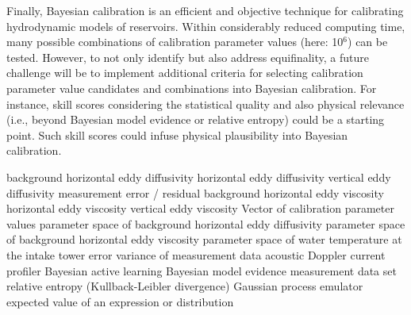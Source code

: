 \documentclass[draft,linenumbers,onecolumn]{agujournal2019} %
\begin{document}
Finally, Bayesian calibration is an efficient and objective technique for calibrating hydrodynamic models of reservoirs. Within considerably reduced computing time, many possible combinations of calibration parameter values (here: 10$^6$) can be tested. However, to not only identify but also address equifinality, a future challenge will be to implement additional criteria for selecting calibration parameter value candidates and combinations into Bayesian calibration. For instance, skill scores considering the statistical quality and also physical relevance (i.e., beyond Bayesian model evidence or relative entropy) could be a starting point. Such skill scores could infuse physical plausibility into Bayesian calibration.


\begin{notation}
	 background horizontal eddy diffusivity
	 horizontal eddy diffusivity
	 vertical eddy diffusivity
	\notation{$\varepsilon$} measurement error / residual
	 background horizontal eddy viscosity
	 horizontal eddy viscosity
	 vertical eddy viscosity
	\notation{$\Omega$} Vector of calibration parameter values
	 parameter space of background horizontal eddy diffusivity
	 parameter space of background horizontal eddy viscosity
	 parameter space of water temperature at the intake tower
	 error variance of measurement data
	 acoustic Doppler current profiler 
	 Bayesian active learning 
	 Bayesian model evidence
	 measurement data set
	 relative entropy (Kullback-Leibler divergence)
	 Gaussian process emulator 	
	 expected value of an expression or distribution

\end{notation}
\end{document}
